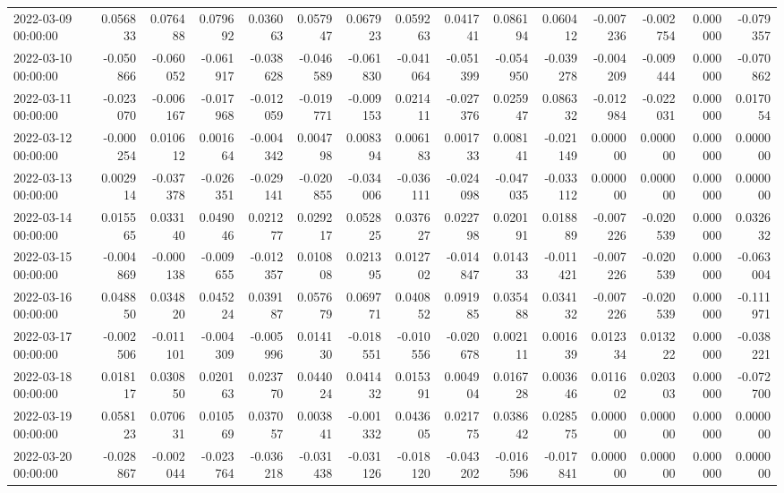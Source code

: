 \begin{tabular}{lrrrrrrrrrrrrrr}
2022-03-09 00:00:00 & 0.056833 & 0.076488 & 0.079692 & 0.036063 & 0.057947 & 0.067923 & 0.059263 & 0.041741 & 0.086194 & 0.060412 & -0.007236 & -0.002754 & 0.000000 & -0.079357 \\
2022-03-10 00:00:00 & -0.050866 & -0.060052 & -0.061917 & -0.038628 & -0.046589 & -0.061830 & -0.041064 & -0.051399 & -0.054950 & -0.039278 & -0.004209 & -0.009444 & 0.000000 & -0.070862 \\
2022-03-11 00:00:00 & -0.023070 & -0.006167 & -0.017968 & -0.012059 & -0.019771 & -0.009153 & 0.021411 & -0.027376 & 0.025947 & 0.086332 & -0.012984 & -0.022031 & 0.000000 & 0.017054 \\
2022-03-12 00:00:00 & -0.000254 & 0.010612 & 0.001664 & -0.004342 & 0.004798 & 0.008394 & 0.006183 & 0.001733 & 0.008141 & -0.021149 & 0.000000 & 0.000000 & 0.000000 & 0.000000 \\
2022-03-13 00:00:00 & 0.002914 & -0.037378 & -0.026351 & -0.029141 & -0.020855 & -0.034006 & -0.036111 & -0.024098 & -0.047035 & -0.033112 & 0.000000 & 0.000000 & 0.000000 & 0.000000 \\
2022-03-14 00:00:00 & 0.015565 & 0.033140 & 0.049046 & 0.021277 & 0.029217 & 0.052825 & 0.037627 & 0.022798 & 0.020191 & 0.018889 & -0.007226 & -0.020539 & 0.000000 & 0.032632 \\
2022-03-15 00:00:00 & -0.004869 & -0.000138 & -0.009655 & -0.012357 & 0.010808 & 0.021395 & 0.012702 & -0.014847 & 0.014333 & -0.011421 & -0.007226 & -0.020539 & 0.000000 & -0.063004 \\
2022-03-16 00:00:00 & 0.048850 & 0.034820 & 0.045224 & 0.039187 & 0.057679 & 0.069771 & 0.040852 & 0.091985 & 0.035488 & 0.034132 & -0.007226 & -0.020539 & 0.000000 & -0.111971 \\
2022-03-17 00:00:00 & -0.002506 & -0.011101 & -0.004309 & -0.005996 & 0.014130 & -0.018551 & -0.010556 & -0.020678 & 0.002111 & 0.001639 & 0.012334 & 0.013222 & 0.000000 & -0.038221 \\
2022-03-18 00:00:00 & 0.018117 & 0.030850 & 0.020163 & 0.023770 & 0.044024 & 0.041432 & 0.015391 & 0.004904 & 0.016728 & 0.003646 & 0.011602 & 0.020303 & 0.000000 & -0.072700 \\
2022-03-19 00:00:00 & 0.058123 & 0.070631 & 0.010569 & 0.037057 & 0.003841 & -0.001332 & 0.043605 & 0.021775 & 0.038642 & 0.028575 & 0.000000 & 0.000000 & 0.000000 & 0.000000 \\
2022-03-20 00:00:00 & -0.028867 & -0.002044 & -0.023764 & -0.036218 & -0.031438 & -0.031126 & -0.018120 & -0.043202 & -0.016596 & -0.017841 & 0.000000 & 0.000000 & 0.000000 & 0.000000 \\

\end{tabular}
